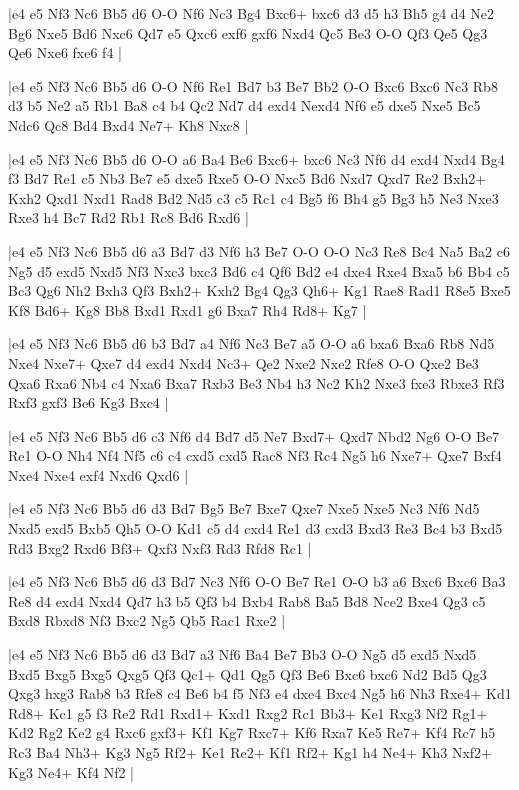 \whitename{}
\blackname{}
\makegametitle
|e4 e5 Nf3 Nc6 Bb5 d6 O-O Nf6 Nc3 Bg4 Bxc6+ bxc6 d3 d5 h3 Bh5 g4 d4 Ne2 Bg6 Nxe5 Bd6 Nxc6 Qd7 e5 Qxc6 exf6 gxf6 Nxd4 Qc5 Be3 O-O Qf3 Qe5 Qg3 Qe6 Nxe6 fxe6 f4  |

\whitename{}
\blackname{}
\makegametitle
|e4 e5 Nf3 Nc6 Bb5 d6 O-O Nf6 Re1 Bd7 b3 Be7 Bb2 O-O Bxc6 Bxc6 Nc3 Rb8 d3 b5 Ne2 a5 Rb1 Ba8 c4 b4 Qc2 Nd7 d4 exd4 Nexd4 Nf6 e5 dxe5 Nxe5 Bc5 Ndc6 Qc8 Bd4 Bxd4 Ne7+ Kh8 Nxc8  |

\whitename{}
\blackname{}
\makegametitle
|e4 e5 Nf3 Nc6 Bb5 d6 O-O a6 Ba4 Be6 Bxc6+ bxc6 Nc3 Nf6 d4 exd4 Nxd4 Bg4 f3 Bd7 Re1 c5 Nb3 Be7 e5 dxe5 Rxe5 O-O Nxc5 Bd6 Nxd7 Qxd7 Re2 Bxh2+ Kxh2 Qxd1 Nxd1 Rad8 Bd2 Nd5 c3 c5 Rc1 c4 Bg5 f6 Bh4 g5 Bg3 h5 Ne3 Nxe3 Rxe3 h4 Bc7 Rd2 Rb1 Rc8 Bd6 Rxd6  |

\whitename{}
\blackname{}
\makegametitle
|e4 e5 Nf3 Nc6 Bb5 d6 a3 Bd7 d3 Nf6 h3 Be7 O-O O-O Nc3 Re8 Bc4 Na5 Ba2 c6 Ng5 d5 exd5 Nxd5 Nf3 Nxc3 bxc3 Bd6 c4 Qf6 Bd2 e4 dxe4 Rxe4 Bxa5 b6 Bb4 c5 Bc3 Qg6 Nh2 Bxh3 Qf3 Bxh2+ Kxh2 Bg4 Qg3 Qh6+ Kg1 Rae8 Rad1 R8e5 Bxe5 Kf8 Bd6+ Kg8 Bb8 Bxd1 Rxd1 g6 Bxa7 Rh4 Rd8+ Kg7  |

\whitename{}
\blackname{}
\makegametitle
|e4 e5 Nf3 Nc6 Bb5 d6 b3 Bd7 a4 Nf6 Nc3 Be7 a5 O-O a6 bxa6 Bxa6 Rb8 Nd5 Nxe4 Nxe7+ Qxe7 d4 exd4 Nxd4 Nc3+ Qe2 Nxe2 Nxe2 Rfe8 O-O Qxe2 Be3 Qxa6 Rxa6 Nb4 c4 Nxa6 Bxa7 Rxb3 Be3 Nb4 h3 Nc2 Kh2 Nxe3 fxe3 Rbxe3 Rf3 Rxf3 gxf3 Be6 Kg3 Bxc4  |

\whitename{}
\blackname{}
\makegametitle
|e4 e5 Nf3 Nc6 Bb5 d6 c3 Nf6 d4 Bd7 d5 Ne7 Bxd7+ Qxd7 Nbd2 Ng6 O-O Be7 Re1 O-O Nh4 Nf4 Nf5 c6 c4 cxd5 cxd5 Rac8 Nf3 Rc4 Ng5 h6 Nxe7+ Qxe7 Bxf4 Nxe4 Nxe4 exf4 Nxd6 Qxd6  |

\whitename{}
\blackname{}
\makegametitle
|e4 e5 Nf3 Nc6 Bb5 d6 d3 Bd7 Bg5 Be7 Bxe7 Qxe7 Nxe5 Nxe5 Nc3 Nf6 Nd5 Nxd5 exd5 Bxb5 Qh5 O-O Kd1 c5 d4 cxd4 Re1 d3 cxd3 Bxd3 Re3 Bc4 b3 Bxd5 Rd3 Bxg2 Rxd6 Bf3+ Qxf3 Nxf3 Rd3 Rfd8 Rc1  |

\whitename{}
\blackname{}
\makegametitle
|e4 e5 Nf3 Nc6 Bb5 d6 d3 Bd7 Nc3 Nf6 O-O Be7 Re1 O-O b3 a6 Bxc6 Bxc6 Ba3 Re8 d4 exd4 Nxd4 Qd7 h3 b5 Qf3 b4 Bxb4 Rab8 Ba5 Bd8 Nce2 Bxe4 Qg3 c5 Bxd8 Rbxd8 Nf3 Bxc2 Ng5 Qb5 Rac1 Rxe2  |

\whitename{}
\blackname{}
\makegametitle
|e4 e5 Nf3 Nc6 Bb5 d6 d3 Bd7 a3 Nf6 Ba4 Be7 Bb3 O-O Ng5 d5 exd5 Nxd5 Bxd5 Bxg5 Bxg5 Qxg5 Qf3 Qc1+ Qd1 Qg5 Qf3 Be6 Bxc6 bxc6 Nd2 Bd5 Qg3 Qxg3 hxg3 Rab8 b3 Rfe8 c4 Be6 b4 f5 Nf3 e4 dxe4 Bxc4 Ng5 h6 Nh3 Rxe4+ Kd1 Rd8+ Kc1 g5 f3 Re2 Rd1 Rxd1+ Kxd1 Rxg2 Rc1 Bb3+ Ke1 Rxg3 Nf2 Rg1+ Kd2 Rg2 Ke2 g4 Rxc6 gxf3+ Kf1 Kg7 Rxc7+ Kf6 Rxa7 Ke5 Re7+ Kf4 Rc7 h5 Rc3 Ba4 Nh3+ Kg3 Ng5 Rf2+ Ke1 Re2+ Kf1 Rf2+ Kg1 h4 Ne4+ Kh3 Nxf2+ Kg3 Ne4+ Kf4 Nf2  |

